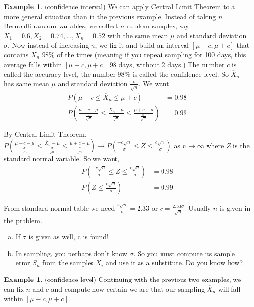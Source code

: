\documentclass[12pt]{amsart}
\theoremstyle{definition}
\newtheorem{example}[theorem]{Example}
\begin{document}
\begin{example} (confidence interval) We can apply Central Limit Theorem to a more general situation than in the previous example. Instead of taking $n$ Bernoulli random variables, we collect $n$ random samples, say $X_1 = 0.6, X_2 = 0.74, \dots , X_n = 0.52$ with the same mean $\mu$ and standard deviation $\sigma$. Now instead of increasing $n$, we fix it and build an interval $[\mu - c, \mu + c]$ that contains $\overline{X}_n$ $98\%$ of the times (meaning if you repeat sampling for 100 days, this average falls within $[\mu - c, \mu + c]$ 98 days, without 2 days.) The number $c$ is called the accuracy level, the number $98\%$ is called the confidence level. So $\overline{X}_n$ has same mean $\mu$ and standard deviation $\frac{\sigma}{\sqrt n}$. We want
\begin{align*}
P(\mu -c \leq \overline{X}_n \leq \mu +c) & = 0.98 \\
P \left( \frac{\mu -c- \mu}{\frac{\sigma}{\sqrt n}}\leq \frac{\overline{X}_n-\mu}{\frac{\sigma}{\sqrt n}} \leq \frac{\mu +c- \mu}{\frac{\sigma}{\sqrt n}} \right) & = 0.98
\end{align*}

By Central Limit Theorem, $P \left( \frac{\mu -c- \mu}{\frac{\sigma}{\sqrt n}}\leq \frac{\overline{X}_n-\mu}{\frac{\sigma}{\sqrt n}} \leq \frac{\mu +c- \mu}{\frac{\sigma}{\sqrt n}} \right) \to P \left(\frac{-c \sqrt n}{\sigma} \leq Z \leq \frac{c \sqrt n}{\sigma} \right)$ as $n \to \infty$ where $Z$ is the standard normal variable. So we want,
\begin{align*}
P \left(\frac{-c \sqrt n}{\sigma} \leq Z \leq \frac{c \sqrt n}{\sigma} \right) & = 0.98 \\
P \left( Z \leq \frac{c \sqrt n}{\sigma} \right) & = 0.99
\end{align*}

From standard normal table we need $\frac{c\sqrt{n}}{\sigma} = 2.33$ or $c = \frac{2.33 \sigma}{\sqrt n}$. Usually $n$ is given in the problem.
\begin{enumerate}[a.]
\item If $\sigma$ is given as well, c is found!
\item In sampling, you perhaps don't know $\sigma$. So you must
compute its sample error $S_n$ from the samples $X_i$ and use it as a substitute. Do you know how?
\end{enumerate}
\end{example}

\begin{example} (confidence level) Continuing with the previous two examples, we can fix $n$ and $c$ and compute how certain we are that our sampling $\overline{X}_n$ will fall within $[\mu - c, \mu + c]$.
\end{example}
\end{document}
